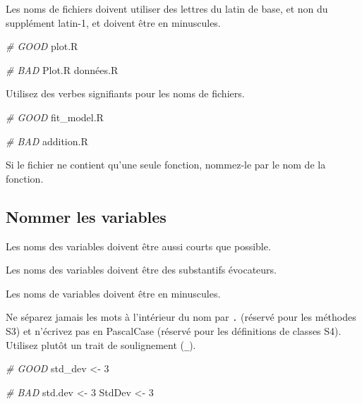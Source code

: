 \documentclass[
  french,
]{scrbook}
\newenvironment{Shaded}{\begin{snugshade}}{\end{snugshade}}
\newcommand{\CommentTok}[1]{\textcolor[rgb]{0.56,0.35,0.01}{\textit{#1}}}
\newcommand{\DecValTok}[1]{\textcolor[rgb]{0.00,0.00,0.81}{#1}}
\newcommand{\NormalTok}[1]{#1}
\newcommand{\OtherTok}[1]{\textcolor[rgb]{0.56,0.35,0.01}{#1}}
\begin{document}
Les noms de fichiers doivent utiliser des lettres du latin de base, et non du supplément latin-1, et doivent être en minuscules.

\begin{Shaded}
\begin{Highlighting}[]
\CommentTok{\# GOOD}
\NormalTok{plot.R}

\CommentTok{\# BAD}
\NormalTok{Plot.R}
\NormalTok{données.R}
\end{Highlighting}
\end{Shaded}

Utilisez des verbes signifiants pour les noms de fichiers.

\begin{Shaded}
\begin{Highlighting}[]
\CommentTok{\# GOOD}
\NormalTok{fit\_model.R}

\CommentTok{\# BAD}
\NormalTok{addition.R}
\end{Highlighting}
\end{Shaded}

Si le fichier ne contient qu'une seule fonction, nommez-le par le nom de la fonction.

\hypertarget{nommer-les-variables}{%
\subsection{Nommer les variables}\label{nommer-les-variables}}

Les noms des variables doivent être aussi courts que possible.

Les noms des variables doivent être des substantifs évocateurs.

Les noms de variables doivent être en minuscules.

Ne séparez jamais les mots à l'intérieur du nom par \texttt{.} (réservé pour les méthodes S3) et n'écrivez pas en PascalCase (réservé pour les définitions de classes S4). Utilisez plutôt un trait de soulignement (\texttt{\_}).

\begin{Shaded}
\begin{Highlighting}[]
\CommentTok{\# GOOD}
\NormalTok{std\_dev }\OtherTok{\textless{}{-}} \DecValTok{3}

\CommentTok{\# BAD}
\NormalTok{std.dev }\OtherTok{\textless{}{-}} \DecValTok{3}
\NormalTok{StdDev }\OtherTok{\textless{}{-}} \DecValTok{3}
\end{Highlighting}
\end{Shaded}
\end{document}
